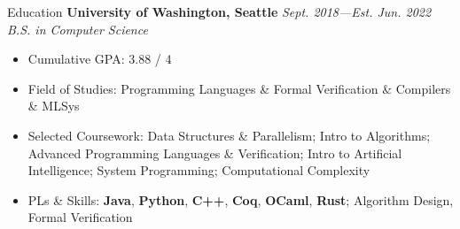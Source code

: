 \documentclass{resume}
\begin{document}
	\begin{rSection}{Education}
	{\bf University of Washington, Seattle} \hfill {\em Sept. 2018---Est. Jun. 2022} \\
	\textit{B.S. in Computer Science}
	\vspace{-5pt}
        \begin{itemize}[leftmargin=*]
            \setlength{\itemsep}{1pt}
            \setlength{\parskip}{0pt}
			\setlength{\parsep}{0pt}
			\item Cumulative GPA: 3.88 / 4
            \item Field of Studies: Programming Languages \& Formal Verification \& Compilers \& MLSys
            \item Selected Coursework: Data Structures \& Parallelism; Intro to Algorithms; Advanced Programming Languages \& Verification; Intro to Artificial Intelligence; System Programming; Computational Complexity
			\item PLs \& Skills: \textbf{Java}, \textbf{Python}, \textbf{C++}, \textbf{Coq}, \textbf{OCaml}, \textbf{Rust}; Algorithm Design, Formal Verification
		\end{itemize}
	\end{rSection}
	\vspace{-5pt}

\end{document}

